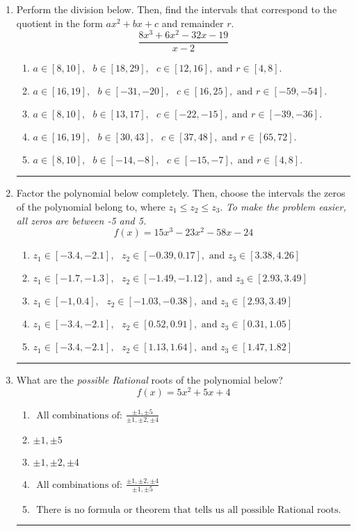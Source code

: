 \documentclass[14pt]{extbook}
\newcommand{\litem}[1]{\item#1\hspace*{-1cm}\rule{\textwidth}{0.4pt}}
\begin{document}
\begin{enumerate}
{\begin{enumerate}[label=\Alph*.]
\end{enumerate} }
\litem{
Perform the division below. Then, find the intervals that correspond to the quotient in the form $ax^2+bx+c$ and remainder $r$.\[ \frac{8x^{3} +6 x^{2} -32 x -19}{x -2} \]\begin{enumerate}[label=\Alph*.]
\item \( a \in [8, 10], \text{   } b \in [18, 29], \text{   } c \in [12, 16], \text{   and   } r \in [4, 8]. \)
\item \( a \in [16, 19], \text{   } b \in [-31, -20], \text{   } c \in [16, 25], \text{   and   } r \in [-59, -54]. \)
\item \( a \in [8, 10], \text{   } b \in [13, 17], \text{   } c \in [-22, -15], \text{   and   } r \in [-39, -36]. \)
\item \( a \in [16, 19], \text{   } b \in [30, 43], \text{   } c \in [37, 48], \text{   and   } r \in [65, 72]. \)
\item \( a \in [8, 10], \text{   } b \in [-14, -8], \text{   } c \in [-15, -7], \text{   and   } r \in [4, 8]. \)

\end{enumerate} }
\litem{
Factor the polynomial below completely. Then, choose the intervals the zeros of the polynomial belong to, where $z_1 \leq z_2 \leq z_3$. \textit{To make the problem easier, all zeros are between -5 and 5.}\[ f(x) = 15x^{3} -23 x^{2} -58 x -24 \]\begin{enumerate}[label=\Alph*.]
\item \( z_1 \in [-3.4, -2.1], \text{   }  z_2 \in [-0.39, 0.17], \text{   and   } z_3 \in [3.38, 4.26] \)
\item \( z_1 \in [-1.7, -1.3], \text{   }  z_2 \in [-1.49, -1.12], \text{   and   } z_3 \in [2.93, 3.49] \)
\item \( z_1 \in [-1, 0.4], \text{   }  z_2 \in [-1.03, -0.38], \text{   and   } z_3 \in [2.93, 3.49] \)
\item \( z_1 \in [-3.4, -2.1], \text{   }  z_2 \in [0.52, 0.91], \text{   and   } z_3 \in [0.31, 1.05] \)
\item \( z_1 \in [-3.4, -2.1], \text{   }  z_2 \in [1.13, 1.64], \text{   and   } z_3 \in [1.47, 1.82] \)

\end{enumerate} }
\litem{
What are the \textit{possible Rational} roots of the polynomial below?\[ f(x) = 5x^{2} +5 x + 4 \]\begin{enumerate}[label=\Alph*.]
\item \( \text{ All combinations of: }\frac{\pm 1,\pm 5}{\pm 1,\pm 2,\pm 4} \)
\item \( \pm 1,\pm 5 \)
\item \( \pm 1,\pm 2,\pm 4 \)
\item \( \text{ All combinations of: }\frac{\pm 1,\pm 2,\pm 4}{\pm 1,\pm 5} \)
\item \( \text{ There is no formula or theorem that tells us all possible Rational roots.} \)


\end{enumerate}}
\end{enumerate}
\end{document}
